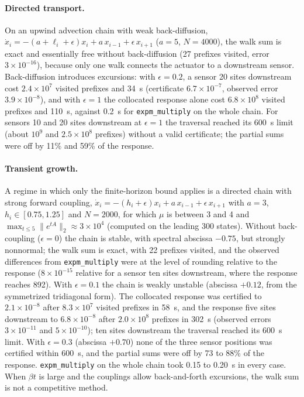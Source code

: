 \paragraph*{Directed transport.} On an upwind advection chain with weak back-diffusion, $\dot x_i=-(a+\ell_i+\epsilon)x_i+a\,x_{i-1}+\epsilon\,x_{i+1}$ ($a=5$, $N=4000$), the walk sum is exact and essentially free without back-diffusion (27 prefixes visited, error $3\times10^{-16}$), because only one walk connects the actuator to a downstream sensor. Back-diffusion introduces excursions: with $\epsilon=0.2$, a sensor 20 sites downstream cost $2.4\times10^7$ visited prefixes and 34~s (certificate $6.7\times10^{-7}$, observed error $3.9\times10^{-8}$), and with $\epsilon=1$ the collocated response alone cost $6.8\times10^8$ visited prefixes and 110~s, against 0.2~s for \texttt{expm\_multiply} on the whole chain. For sensors 10 and 20 sites downstream at $\epsilon=1$ the traversal reached its 600~s limit (about $10^9$ and $2.5\times10^8$ prefixes) without a valid certificate; the partial sums were off by 11\% and 59\% of the response.

\paragraph*{Transient growth.} A regime in which only the finite-horizon bound applies is a directed chain with strong forward coupling, $\dot x_i=-(h_i+\epsilon)x_i+a\,x_{i-1}+\epsilon\,x_{i+1}$ with $a=3$, $h_i\in[0.75,1.25]$ and $N=2000$, for which $\mu$ is between 3 and 4 and $\max_{t\le5}\|e^{tA}\|_2\approx3\times10^4$ (computed on the leading 300 states). Without back-coupling ($\epsilon=0$) the chain is stable, with spectral abscissa $-0.75$, but strongly nonnormal; the walk sum is exact, with 22 prefixes visited, and the observed differences from \texttt{expm\_multiply} were at the level of rounding relative to the response ($8\times10^{-15}$ relative for a sensor ten sites downstream, where the response reaches 892). With $\epsilon=0.1$ the chain is weakly unstable (abscissa $+0.12$, from the symmetrized tridiagonal form). The collocated response was certified to $2.1\times10^{-8}$ after $8.3\times10^7$ visited prefixes in 58~s, and the response five sites downstream to $6.8\times10^{-8}$ after $2.0\times10^8$ prefixes in 302~s (observed errors $3\times10^{-11}$ and $5\times10^{-10}$); ten sites downstream the traversal reached its 600~s limit. With $\epsilon=0.3$ (abscissa $+0.70$) none of the three sensor positions was certified within 600~s, and the partial sums were off by 73 to 88\% of the response. \texttt{expm\_multiply} on the whole chain took 0.15 to 0.20~s in every case. When $\beta t$ is large and the couplings allow back-and-forth excursions, the walk sum is not a competitive method.
